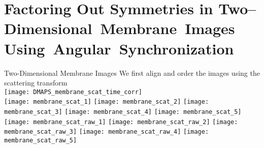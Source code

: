 \section[Unaligned Membrane Images]{Factoring Out Symmetries in Two--Dimensional~Membrane~Images Using~Angular~Synchronization}

\begin{frame}{Two-Dimensional Membrane Images}
    We first align and order the images using the scattering transform\\
    
    \centering
    \texttt{[image: DMAPS\_membrane\_scat\_time\_corr]}\\
    \texttt{[image: membrane\_scat\_1]}
    \texttt{[image: membrane\_scat\_2]}
    \texttt{[image: membrane\_scat\_3]}
    \texttt{[image: membrane\_scat\_4]}
    \texttt{[image: membrane\_scat\_5]}\\
    \texttt{[image: membrane\_scat\_raw\_1]}
    \texttt{[image: membrane\_scat\_raw\_2]}
    \texttt{[image: membrane\_scat\_raw\_3]}
    \texttt{[image: membrane\_scat\_raw\_4]}
    \texttt{[image: membrane\_scat\_raw\_5]}
    
\end{frame}

    
    

    